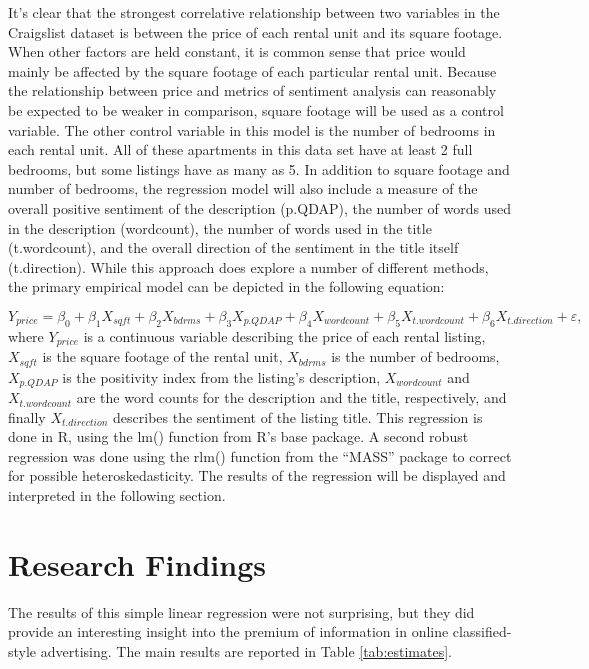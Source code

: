 \documentclass[12pt,english]{article}
\begin{document}
It’s clear that the strongest correlative relationship between two variables in the Craigslist dataset is between the price of each rental unit and its square footage. When other factors are held constant, it is common sense that price would mainly be affected by the square footage of each particular rental unit. Because the relationship between price and metrics of sentiment analysis can reasonably be expected to be weaker in comparison, square footage will be used as a control variable. The other control variable in this model is the number of bedrooms in each rental unit. All of these apartments in this data set have at least 2 full bedrooms, but some listings have as many as 5. In addition to square footage and number of bedrooms, the regression model will also include a measure of the overall positive sentiment of the description (p.QDAP), the number of words used in the description (wordcount), the number of words used in the title (t.wordcount), and the overall direction of the sentiment in the title itself (t.direction). While this approach does explore a number of different methods, the primary empirical model can be depicted in the following equation:

\begin{equation}
\label{eq:1}
Y_{price}=\beta_{0} + \beta_{1}X_{sqft} + \beta_{2} X_{bdrms} + \beta_{3}X_{p.QDAP} + \beta_{4}X_{wordcount} + \beta_{5}X_{t.wordcount}+\beta_{6}X_{t.direction} + \varepsilon,
\end{equation}
where $Y_{price}$ is a continuous variable describing the price of each rental listing, $X_{sqft}$ is the square footage of the rental unit, $X_{bdrms}$ is the number of bedrooms, $X_{p.QDAP}$ is the positivity index from the listing's description, $X_{wordcount}$ and $X_{t.wordcount}$ are the word counts for the description and the title, respectively, and finally $X_{t.direction}$ describes the sentiment of the listing title. This regression is done in R, using the lm() function from R’s base package. A second robust regression was done using the rlm() function from the “MASS” package to correct for possible heteroskedasticity. The results of the regression will be displayed and interpreted in the following section.

\section{Research Findings}\label{sec:results}

The results of this simple linear regression were not surprising, but they did provide an interesting insight into the premium of information in online classified-style advertising. The main results are reported in Table \ref{tab:estimates}.
\end{document}
